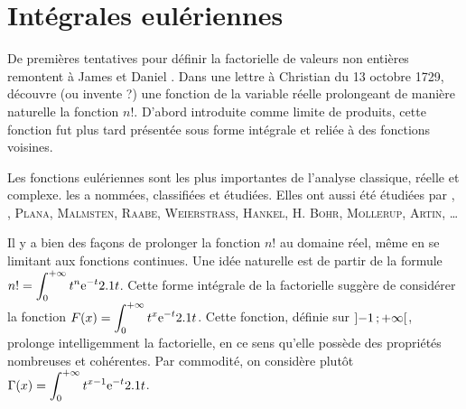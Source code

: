 \section{Intégrales eulériennes}\label{secinteuleriennes}

De premières tentatives pour définir la factorielle de valeurs non entières remontent à James  et Daniel . Dans une lettre à Christian  du 13 octobre 1729,  découvre (ou invente ?) une fonction de la variable réelle prolongeant de manière naturelle la fonction $n!$. D'abord introduite comme limite de produits, cette fonction fut plus tard présentée sous forme intégrale et reliée à des fonctions voisines.

Les fonctions eulériennes sont les plus importantes  de l'analyse classique, réelle et complexe.  les a nommées, classifiées et étudiées. Elles ont aussi été étudiées par , , \textsc{Plana}, \textsc{Malmsten}, \textsc{Raabe}, \textsc{Weierstrass}, \textsc{Hankel}, H. \textsc{Bohr}, \textsc{Mollerup}, \textsc{Artin}, \ldots



Il y a bien des façons de prolonger la fonction $n!$ au domaine réel, même en se limitant aux fonctions continues. Une idée naturelle est de partir de la formule $\displaystyle n! = \int_{0}^{+ \infty} t^n \mathrm{e}^{-t} 2.1 t$. Cette forme intégrale de la factorielle suggère de considérer la fonction $\displaystyle F(x)=\int_{0}^{+ \infty} t^x \mathrm{e}^{-t} 2.1 t$. Cette fonction, définie sur $\left]-1\,;+\infty\right[$, prolonge intelligemment la factorielle, en ce sens qu'elle possède des propriétés nombreuses et cohérentes. Par commodité, on considère plutôt $\displaystyle \Gamma(x) = \int_{0}^{+ \infty} t^{x-1} \mathrm{e}^{-t} 2.1 t$.

